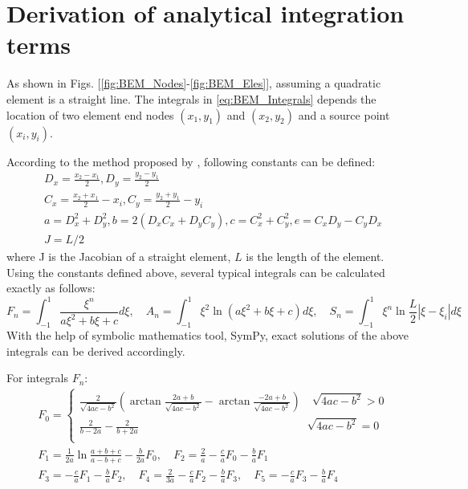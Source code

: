\documentclass[num-refs]{wiley-networks}
\begin{document}
\section{Derivation of analytical integration terms}
\label{AppendixB}

As shown in Figs. [\ref{fig:BEM_Nodes}-\ref{fig:BEM_Eles}], assuming a quadratic element is a straight line. The integrals in \ref{eq:BEM_Integrals} depends the location of two element end nodes $\left( x_1,y_1 \right)$ and $\left( x_2,y_2 \right)$ and a source point $\left( x_i,y_i \right)$. 

According to the method proposed by \cite{zhang2003exact,zhang2008exact}, following constants can be defined:
\begin{eqnarray}
    &D_x=\frac{x_2-x_1}{2},D_y=\frac{y_2-y_1}{2}
    \\
    &C_x=\frac{x_2+x_1}{2}-x_i,C_y=\frac{y_2+y_1}{2}-y_i
    \\
    &a=D_{x}^{2}+D_{y}^{2},b=2\left( D_xC_x+D_yC_y \right) ,c=C_{x}^{2}+C_{y}^{2},e=C_xD_y-C_yD_x
    \\
    &J=L/2
\end{eqnarray}
where J is the Jacobian of a straight element, $L$ is the length of the element. Using the constants defined above, several typical integrals can be calculated exactly as follows:
\begin{equation}
    F_n=\int_{-1}^1{\frac{\xi ^n}{a\xi ^2+b\xi +c}d\xi},\quad A_n=\int_{-1}^1{\xi ^2\ln \left( a\xi ^2+b\xi +c \right) d\xi},\quad  S_n=\int_{-1}^1{\xi ^n\ln \frac{L}{2}\left| \xi -\xi _i \right|d\xi}
\end{equation}
With the help of symbolic mathematics tool, SymPy\cite{SymPyCite}, exact solutions of the above integrals can be derived accordingly.

For integrals $F_n$:
\begin{eqnarray}
    &F_0=\left\{ \begin{array}{c}
	\frac{2}{\sqrt{4ac-b^2}}\left( \arctan \frac{2a+b}{\sqrt{4ac-b^2}}-\arctan \frac{-2a+b}{\sqrt{4ac-b^2}} \right) \quad  \sqrt{4ac-b^2}>0\\
	\frac{2}{b-2a}-\frac{2}{b+2a}                                            \qquad\qquad\qquad\qquad\qquad\qquad\qquad\quad  \sqrt{4ac-b^2}=0\\
\end{array} \right. 
\\
&F_1=\frac{1}{2a}\ln \frac{a+b+c}{a-b+c}-\frac{b}{2a}F_0,\quad F_2=\frac{2}{a}-\frac{c}{a}F_0-\frac{b}{a}F_1
\\
&F_3=-\frac{c}{a}F_1-\frac{b}{a}F_2,\quad F_4=\frac{2}{3a}-\frac{c}{a}F_2-\frac{b}{a}F_3,\quad F_5=-\frac{c}{a}F_3-\frac{b}{a}F_4
\end{eqnarray}
\end{document}
